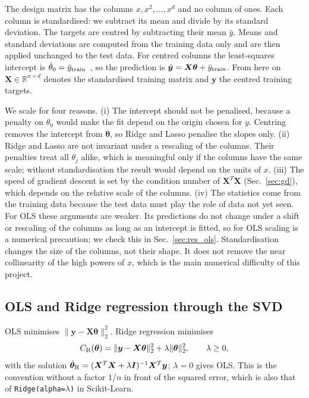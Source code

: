 \documentclass[aps,reprint,amsmath,amssymb,nofootinbib,floatfix]{revtex4-2}
\newcommand{\norm}[1]{\lVert #1\rVert}
\begin{document}
The design matrix has the columns $x,x^2,\dots,x^d$ and no column of ones. Each column is
standardised: we subtract its mean and divide by its standard deviation. The targets are centred by
subtracting their mean $\bar y$. Means and standard deviations are computed from the training data
only and are then applied unchanged to the test data. For centred columns the least-squares
intercept is $\hat\theta_0=\bar y_{\rm train}$~\cite{hjorthjensen2026}, so the prediction is
$\tilde{\bm y}=\bm X\bm\theta+\bar y_{\rm train}$. From here on $\bm X\in\mathbb R^{n\times d}$
denotes the standardised training matrix and $\bm y$ the centred training targets.

We scale for four reasons. (i) The intercept should not be penalised, because a penalty on
$\theta_0$ would make the fit depend on the origin chosen for $y$. Centring removes the intercept
from $\bm\theta$, so Ridge and Lasso penalise the slopes only. (ii) Ridge and Lasso are not
invariant under a rescaling of the columns. Their penalties treat all $\theta_j$ alike, which is
meaningful only if the columns have the same scale; without standardisation the result would
depend on the units of $x$. (iii) The speed of gradient descent is set by the condition number of
$\bm X^T\bm X$ (Sec.~\ref{sec:gd}), which depends on the relative scale of the columns. (iv) The
statistics come from the training data because the test data must play the role of data not yet
seen. For OLS these arguments are weaker. Its predictions do not change under a shift or rescaling
of the columns as long as an intercept is fitted, so for OLS scaling is a numerical precaution;
we check this in Sec.~\ref{sec:res_ols}. Standardisation changes the size of the columns, not their
shape. It does not remove the near collinearity of the high powers of $x$, which is the main
numerical difficulty of this project.

\subsection{OLS and Ridge regression through the SVD}\label{sec:ridge}

OLS minimises $\norm{\bm y-\bm X\bm\theta}_2^2$. Ridge regression minimises
\begin{equation}
  C_{\rm R}(\bm\theta)=\norm{\bm y-\bm X\bm\theta}_2^2+\lambda\norm{\bm\theta}_2^2,\qquad\lambda\ge0,
  \label{eq:ridgecost}
\end{equation}
with the solution $\hat{\bm\theta}_{\rm R}=(\bm X^T\bm X+\lambda\bm I)^{-1}\bm X^T\bm y$; $\lambda=0$
gives OLS. This is the convention without a factor $1/n$ in front of the squared error, which is
also that of \texttt{Ridge(alpha=$\lambda$)} in Scikit-Learn.
\end{document}
